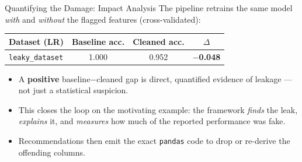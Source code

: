 \documentclass[11pt,aspectratio=169]{beamer}
\begin{document}
\begin{frame}{Quantifying the Damage: Impact Analysis}
  The pipeline retrains the same model \emph{with} and \emph{without} the flagged features (cross-validated):
  \vspace{0.6em}
  \begin{center}
  \begin{tabular}{lccc}
    \toprule
    \textbf{Dataset (LR)} & \textbf{Baseline acc.} & \textbf{Cleaned acc.} & $\Delta$ \\
    \midrule
    \texttt{leaky\_dataset} & 1.000 & 0.952 & \textbf{$-$0.048} \\
    \bottomrule
  \end{tabular}
  \end{center}
  \vspace{0.8em}
  \begin{itemize}\setlength\itemsep{0.6em}
    \item A \textbf{positive} baseline$-$cleaned gap is direct, quantified evidence of leakage --- not just a statistical suspicion.
    \item This closes the loop on the motivating example: the framework \emph{finds} the leak, \emph{explains} it, and \emph{measures} how much of the reported performance was fake.
    \item Recommendations then emit the exact \texttt{pandas} code to drop or re-derive the offending columns.
  \end{itemize}
\end{frame}
\end{document}
